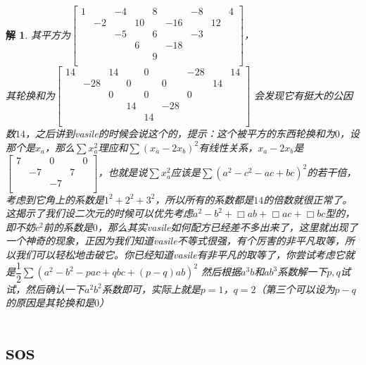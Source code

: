 \documentclass[UTF8]{ctexart}
\newtheorem{2}{解}
\begin{document}
\begin{2}
	其平方为$ \left[\begin{matrix}
		1& &-4& &8& &-8& &4\\
		&-2& &10& &-16& &12&\\
		& &-5& &6& &-3& &\\
		& & &6& &-18& & &\\
		& & & &9& & & &\\
	\end{matrix}\right] $，\\
   其轮换和为$ \left[\begin{matrix}
   	14& &14& &0& &-28& &14\\
   	&-28& &0& &0& &14&\\
   	& &0& &0& &0& &\\
   	& & &14& &-28& & &\\
   	& & & &14& & & &\\
   \end{matrix}\right] $
会发现它有挺大的公因数$ 14 $，之后讲到vasile的时候会说这个的，提示：这个被平方的东西轮换和为$ 0 $，设那个是$ x_a $，那么$ \displaystyle \sum x_a^{2} $理应和$ \displaystyle \sum(x_a-2x_b)^{2} $有线性关系，$ x_a-2x_b $是$ \left[\begin{matrix}
	7& &0& &0\\
	&-7& &7&\\
	& &-7& &\\
\end{matrix}\right] $，也就是说$ \displaystyle \sum x_a^{2} $应该是$ \displaystyle \sum (a^{2}-c^{2}-ac+bc)^{2} $的若干倍，考虑到它角上的系数是$ 1^{2}+2^{2}+3^{2} $，所以所有的系数都是$ 14 $的倍数就很正常了。这揭示了我们设二次元的时候可以优先考虑$ a^{2}-b^{2}+\Box ab+\Box ac+\Box bc $型的，即不妨$ c^{2} $前的系数是$ 0 $，那么其实vasile如何配方已经差不多出来了，这里就出现了一个神奇的现象，正因为我们知道vasile不等式很强，有个厉害的非平凡取等，所以我们可以轻松地击破它。你已经知道vasile有非平凡的取等了，你尝试考虑它就是$ \dfrac{1}{2} \displaystyle \sum (a^{2}-b^{2}-pac+qbc+(p-q)ab)^{2} $
然后根据$ a^{3}b $和$ ab^{3} $系数解一下$ p,q $试试，然后确认一下$ a^{2}b^{2} $系数即可，实际上就是$ p=1 $，$ q=2 $（第三个可以设为$ p-q $的原因是其轮换和是$ 0 $）
\end{2}
\section{sos}
\end{document}
